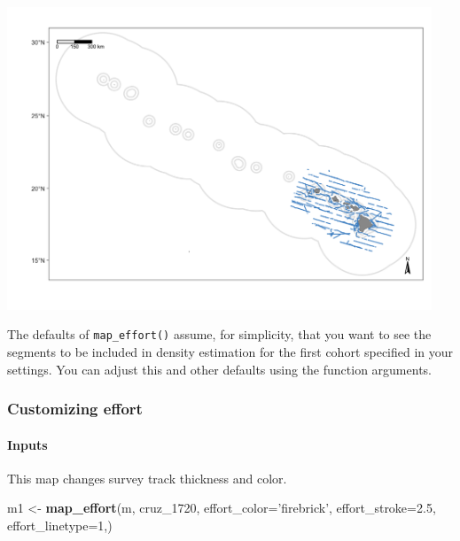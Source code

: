 \documentclass[
]{book}
\newenvironment{Shaded}{\begin{snugshade}}{\end{snugshade}}
\newcommand{\DataTypeTok}[1]{\textcolor[rgb]{0.13,0.29,0.53}{#1}}
\newcommand{\DecValTok}[1]{\textcolor[rgb]{0.00,0.00,0.81}{#1}}
\newcommand{\FloatTok}[1]{\textcolor[rgb]{0.00,0.00,0.81}{#1}}
\newcommand{\KeywordTok}[1]{\textcolor[rgb]{0.13,0.29,0.53}{\textbf{#1}}}
\newcommand{\NormalTok}[1]{#1}
\newcommand{\StringTok}[1]{\textcolor[rgb]{0.31,0.60,0.02}{#1}}
\begin{document}
\includegraphics[width=0.95\textwidth,height=\textheight]{img/map_tracks.png}

The defaults of \texttt{map\_effort()} assume, for simplicity, that you want to see the segments to be included in density estimation for the first cohort specified in your settings. You can adjust this and other defaults using the function arguments.

\hypertarget{customizing-effort}{%
\subsubsection*{Customizing effort}\label{customizing-effort}}

\hypertarget{inputs}{%
\paragraph{Inputs}\label{inputs}}

This map changes survey track thickness and color.

\begin{Shaded}
\begin{Highlighting}[]
\NormalTok{m1 <-}\StringTok{ }\KeywordTok{map_effort}\NormalTok{(m, }
\NormalTok{                cruz_}\DecValTok{1720}\NormalTok{,}
                \DataTypeTok{effort_color=}\StringTok{'firebrick'}\NormalTok{,}
                \DataTypeTok{effort_stroke=}\FloatTok{2.5}\NormalTok{,}
                \DataTypeTok{effort_linetype=}\DecValTok{1}\NormalTok{,)}
\end{Highlighting}
\end{Shaded}
\end{document}
